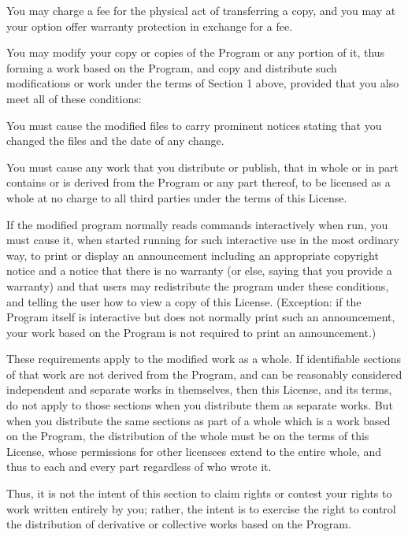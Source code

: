 \begin{lrbox}{\gpl}
\begin{minipage}{3\textwidth}
You may charge a fee for the physical act of transferring a copy, and you
may at your option offer warranty protection in exchange for a fee.

\item
You may modify your copy or copies of the Program or any portion
of it, thus forming a work based on the Program, and copy and
distribute such modifications or work under the terms of Section 1
above, provided that you also meet all of these conditions:

\beginenumeration

\item
You must cause the modified files to carry prominent notices stating that
you changed the files and the date of any change.

\item
You must cause any work that you distribute or publish, that in
whole or in part contains or is derived from the Program or any
part thereof, to be licensed as a whole at no charge to all third
parties under the terms of this License.

\item
If the modified program normally reads commands interactively
when run, you must cause it, when started running for such
interactive use in the most ordinary way, to print or display an
announcement including an appropriate copyright notice and a
notice that there is no warranty (or else, saying that you provide
a warranty) and that users may redistribute the program under
these conditions, and telling the user how to view a copy of this
License.  (Exception: if the Program itself is interactive but
does not normally print such an announcement, your work based on
the Program is not required to print an announcement.)

\endenumeration


These requirements apply to the modified work as a whole.  If
identifiable sections of that work are not derived from the Program,
and can be reasonably considered independent and separate works in
themselves, then this License, and its terms, do not apply to those
sections when you distribute them as separate works.  But when you
distribute the same sections as part of a whole which is a work based
on the Program, the distribution of the whole must be on the terms of
this License, whose permissions for other licensees extend to the
entire whole, and thus to each and every part regardless of who wrote it.

Thus, it is not the intent of this section to claim rights or contest
your rights to work written entirely by you; rather, the intent is to
exercise the right to control the distribution of derivative or
collective works based on the Program.


\end{minipage}
\end{lrbox}

